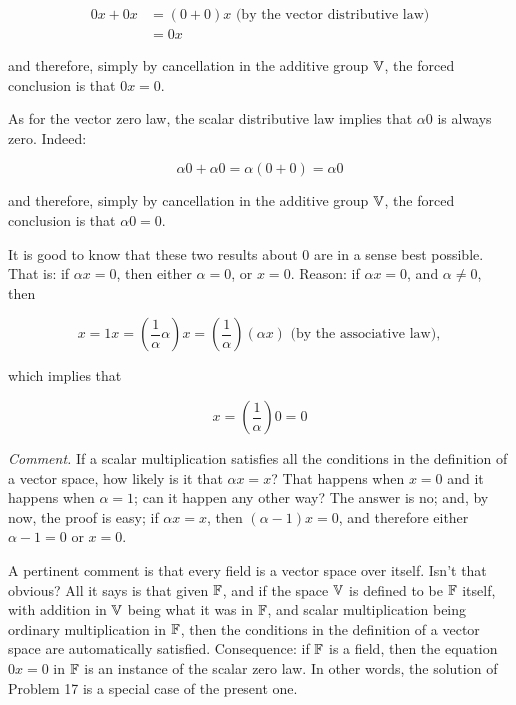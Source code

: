 \begin{align}
    0x + 0x & = (0+0)x \text{ (by the vector distributive law)} \\
            & = 0x
\end{align}

and therefore, simply by cancellation in the additive group $\mathbb{V}$, the forced conclusion is that $0x=0$.

As for the vector zero law, the scalar distributive law implies that $\alpha 0$ is always zero. Indeed:

\begin{equation}
    \alpha 0 + \alpha 0 = \alpha(0+0) = \alpha 0
\end{equation}

and therefore, simply by cancellation in the additive group $\mathbb{V}$, the forced conclusion is that $\alpha 0 = 0$.

It is good to know that these two results about 0 are in a sense best possible. That is: if $\alpha x = 0$, then either $\alpha = 0$, or $x = 0$. Reason: if $\alpha x = 0$, and $\alpha \neq 0$, then

\begin{equation}
    x = 1x = (\frac{1}{\alpha} \alpha)x = (\frac{1}{\alpha}) (\alpha x) \text{ (by the associative law)},
\end{equation}

which implies that

\begin{equation}
    x = (\frac{1}{\alpha}) 0 = 0
\end{equation}

\textit{Comment.} If a scalar multiplication satisfies all the conditions in the definition of a vector space, how likely is it that $\alpha x = x$? That happens when $x = 0$ and it happens when $\alpha = 1$; can it happen any other way? The answer is no; and, by now, the proof is easy; if $\alpha x = x$, then $(\alpha - 1)x = 0$, and therefore either $\alpha - 1 = 0$ or $x = 0$.

A pertinent comment is that every field is a vector space over itself. Isn't that obvious? All it says is that given $\mathbb{F}$, and if the space $\mathbb{V}$ is defined to be $\mathbb{F}$ itself, with addition in $\mathbb{V}$ being what it was in $\mathbb{F}$, and scalar multiplication being ordinary multiplication in $\mathbb{F}$, then the conditions in the definition of a vector space are automatically satisfied. Consequence: if $\mathbb{F}$ is a field, then the equation $0x=0$ in $\mathbb{F}$ is an instance of the scalar zero law. In other words, the solution of Problem 17 is a special case of the present one.

